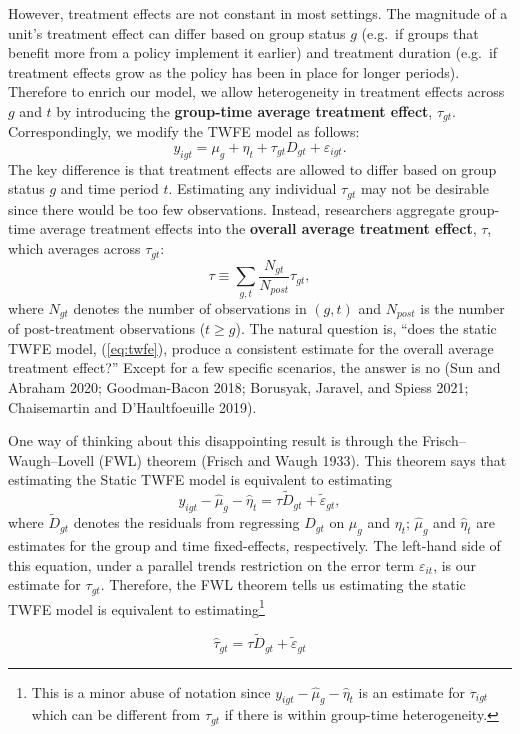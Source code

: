 However, treatment effects are not constant in most settings. The magnitude of a unit's treatment effect can differ based on group status \(g\) (e.g.~if groups that benefit more from a policy implement it earlier) and treatment duration (e.g.~if treatment effects grow as the policy has been in place for longer periods). Therefore to enrich our model, we allow heterogeneity in treatment effects across \(g\) and \(t\) by introducing the \textbf{group-time average treatment effect}, \(\tau_{gt}\). Correspondingly, we modify the TWFE model as follows:
\[
  y_{igt} = \mu_g + \eta_t + \tau_{gt} D_{gt} + \varepsilon_{igt}.
\]
The key difference is that treatment effects are allowed to differ based on group status \(g\) and time period \(t\). Estimating any individual \(\tau_{gt}\) may not be desirable since there would be too few observations. Instead, researchers aggregate group-time average treatment effects into the \textbf{overall average treatment effect}, \(\tau\), which averages across \(\tau_{gt}\):
\[
  \tau \equiv \sum_{g, t} \frac{N_{gt}}{N_{post}} \tau_{gt},
\]
where \(N_{gt}\) denotes the number of observations in \((g, t)\) and \(N_{post}\) is the number of post-treatment observations (\(t \geq g\)). The natural question is, ``does the static TWFE model, (\ref{eq:twfe}), produce a consistent estimate for the overall average treatment effect?'' Except for a few specific scenarios, the answer is no (Sun and Abraham 2020; Goodman-Bacon 2018; Borusyak, Jaravel, and Spiess 2021; Chaisemartin and D'Haultfoeuille 2019).

One way of thinking about this disappointing result is through the Frisch--Waugh--Lovell (FWL) theorem (Frisch and Waugh 1933). This theorem says that estimating the Static TWFE model is equivalent to estimating
\[
y_{igt} - \hat{\mu}_g - \hat{\eta}_t = \tau \tilde{D}_{gt} + \tilde{\varepsilon}_{gt},
\]
where \(\tilde{D}_{gt}\) denotes the residuals from regressing \(D_{gt}\) on \(\mu_g\) and \(\eta_t\); \(\hat{\mu}_g\) and \(\hat{\eta}_t\) are estimates for the group and time fixed-effects, respectively. The left-hand side of this equation, under a parallel trends restriction on the error term \(\varepsilon_{it}\), is our estimate for \(\tau_{gt}\). Therefore, the FWL theorem tells us estimating the static TWFE model is equivalent to estimating\footnote{This is a minor abuse of notation since \(y_{igt} - \hat{\mu}_g - \hat{\eta}_t\) is an estimate for \(\tau_{igt}\) which can be different from \(\tau_{gt}\) if there is within group-time heterogeneity.}

\[
\hat{\tau}_{gt} = \tau \tilde{D}_{gt} + \tilde{\varepsilon}_{gt}
\]

